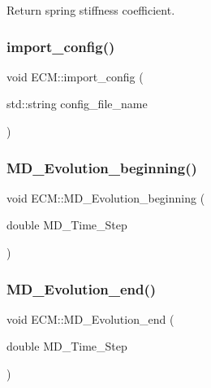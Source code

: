 Return spring stiffness coefficient. \mbox{\label{classECM_ad0f4b70c1e02703565ae0fc6428eaf22}} 
\subsubsection{\texorpdfstring{import\_config()}{import\_config()}}
{\footnotesize\ttfamily void E\+C\+M\+::import\+\_\+config (\begin{DoxyParamCaption}\item[{std\+::string}]{config\+\_\+file\+\_\+name }\end{DoxyParamCaption})}

\mbox{\label{classECM_ace592138fc9af4c5c4717c682924fdbe}} 
\subsubsection{\texorpdfstring{MD\_Evolution\_beginning()}{MD\_Evolution\_beginning()}}
{\footnotesize\ttfamily void E\+C\+M\+::\+M\+D\+\_\+\+Evolution\+\_\+beginning (\begin{DoxyParamCaption}\item[{double}]{M\+D\+\_\+\+Time\+\_\+\+Step }\end{DoxyParamCaption})}

\mbox{\label{classECM_a797a29a087e5aefdb2f14352259df371}} 
\subsubsection{\texorpdfstring{MD\_Evolution\_end()}{MD\_Evolution\_end()}}
{\footnotesize\ttfamily void E\+C\+M\+::\+M\+D\+\_\+\+Evolution\+\_\+end (\begin{DoxyParamCaption}\item[{double}]{M\+D\+\_\+\+Time\+\_\+\+Step }\end{DoxyParamCaption})}

\mbox{\label{classECM_a434a26d9e696995b20642a5e87c2f0c2}} 
